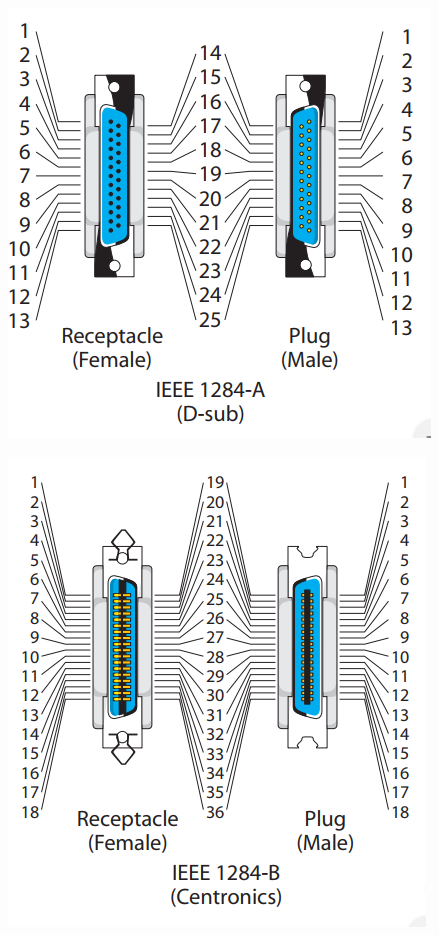 \documentclass[a4paper,12pt]{article}
\begin{document}
\begin{enumerate}
\begin{figure}[H]
   \includegraphics[scale = 0.4]{4.png}
  \end{figure}
  \begin{figure}[H]
   \centering
   \includegraphics[scale = 0.4]{5.png}
  \end{figure}
  \begin{figure}[H]
   \centering

\end{figure}
\end{enumerate}
\end{document}
